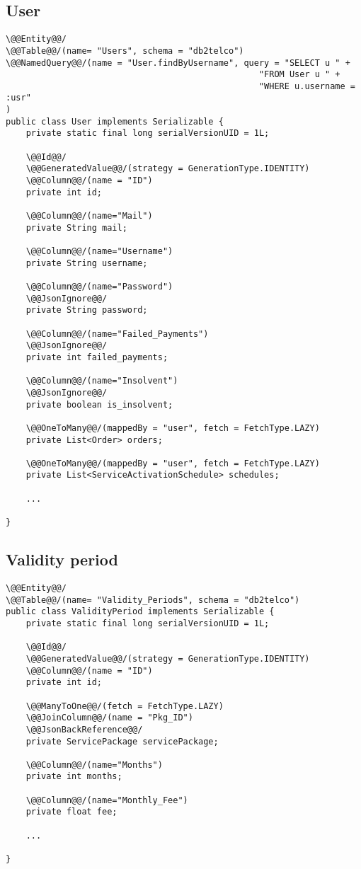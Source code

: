 \subsection*{User}

\begin{lstlisting}[style = JPA]
\@@Entity@@/
\@@Table@@/(name= "Users", schema = "db2telco")
\@@NamedQuery@@/(name = "User.findByUsername", query = "SELECT u " + 
                                                  "FROM User u " + 
                                                  "WHERE u.username = :usr"
)
public class User implements Serializable {
    private static final long serialVersionUID = 1L;

    \@@Id@@/
    \@@GeneratedValue@@/(strategy = GenerationType.IDENTITY)
    \@@Column@@/(name = "ID")
    private int id;

    \@@Column@@/(name="Mail")
    private String mail;

    \@@Column@@/(name="Username")
    private String username;

    \@@Column@@/(name="Password")
    \@@JsonIgnore@@/
    private String password;

    \@@Column@@/(name="Failed_Payments")
    \@@JsonIgnore@@/
    private int failed_payments;

    \@@Column@@/(name="Insolvent")
    \@@JsonIgnore@@/
    private boolean is_insolvent;

    \@@OneToMany@@/(mappedBy = "user", fetch = FetchType.LAZY)
    private List<Order> orders;

    \@@OneToMany@@/(mappedBy = "user", fetch = FetchType.LAZY)
    private List<ServiceActivationSchedule> schedules;
    
    ...

}
\end{lstlisting}

\subsection*{Validity period}

\begin{lstlisting}[style = JPA]
\@@Entity@@/
\@@Table@@/(name= "Validity_Periods", schema = "db2telco")
public class ValidityPeriod implements Serializable {
    private static final long serialVersionUID = 1L;

    \@@Id@@/
    \@@GeneratedValue@@/(strategy = GenerationType.IDENTITY)
    \@@Column@@/(name = "ID")
    private int id;

    \@@ManyToOne@@/(fetch = FetchType.LAZY)
    \@@JoinColumn@@/(name = "Pkg_ID")
    \@@JsonBackReference@@/
    private ServicePackage servicePackage;

    \@@Column@@/(name="Months")
    private int months;

    \@@Column@@/(name="Monthly_Fee")
    private float fee;
    
    ...

}
\end{lstlisting}
